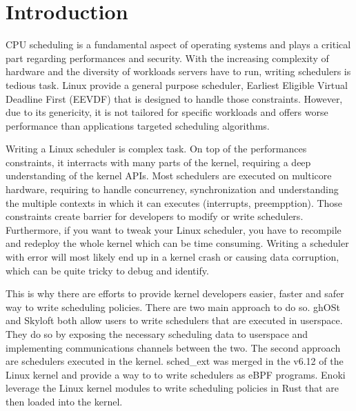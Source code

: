 \section{Introduction}

\par CPU scheduling is a fundamental aspect of operating systems and plays a critical part regarding performances and security. With the increasing complexity of hardware and the diversity of workloads servers have to run, writing schedulers is tedious task. Linux provide a general purpose scheduler, Earliest Eligible Virtual Deadline First (EEVDF)\cite{eevdf} that is designed to handle those constraints. However, due to its genericity, it is not tailored for specific workloads and offers worse performance than applications targeted scheduling algorithms\cite{ghost}. \newline

\par Writing a Linux scheduler is complex task. On top of the performances constraints, it interracts with many parts of the kernel, requiring a deep understanding of the kernel APIs. Most schedulers are executed on multicore hardware, requiring to handle concurrency, synchronization and understanding the multiple contexts in which it can executes (interrupts, preempption). Those constraints create barrier for developers to modify or write schedulers. Furthermore, if you want to tweak your Linux scheduler, you have to recompile and redeploy the whole kernel which can be time consuming. Writing a scheduler with error will most likely end up in a kernel crash or causing data corruption, which can be quite tricky to debug and identify. \newline

\par This is why there are efforts to provide kernel developers easier, faster and safer way to write scheduling policies. There are two main approach to do so. ghOSt\cite{ghost} and Skyloft\cite{skyloft} both allow users to write schedulers that are executed in userspace. They do so by exposing the necessary scheduling data to userspace and implementing communications channels between the two. The second approach are schedulers executed in the kernel. sched\_ext\cite{schedext} was merged in the v6.12 of the Linux kernel and provide a way to to write schedulers as eBPF\cite{ebpf} programs. Enoki\cite{enoki} leverage the Linux kernel modules to write scheduling policies in Rust that are then loaded into the kernel.\newline


